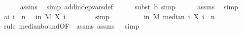 \begin{isabellebody}
\ \ \ \ \isamarkupfalse%
\ assms{\isacharparenleft}{\kern0pt}{}{\isacharparenright}{\kern0pt}\ \isamarkupfalse%
\ {\isacharparenleft}{\kern0pt}simp\ add{\isacharcolon}{\kern0pt}indep{\isacharunderscore}{\kern0pt}vars{\isacharunderscore}{\kern0pt}def{\isacharparenright}{\kern0pt}\isanewline
\ \ \ \ \isamarkupfalse%
\ {\isacharparenleft}{\kern0pt}subst\ b{\isacharcomma}{\kern0pt}\ simp{\isacharparenright}{\kern0pt}\isanewline
\ \ \ \ \isamarkupfalse%
\ assms{\isacharparenleft}{\kern0pt}{}{\isacharparenright}{\kern0pt}\ \isamarkupfalse%
\ simp\isanewline
\isanewline
\ \ \isamarkupfalse%
\ a{\isacharcolon}{\kern0pt}{\isachardoublequoteopen}{\isasymAnd}i{\isachardot}{\kern0pt}\ i\ {\isacharless}{\kern0pt}\ n\ {\isasymLongrightarrow}\ {\isasymP}{\isacharparenleft}{\kern0pt}{\isasymomega}\ in\ M{\isachardot}{\kern0pt}\ X\ i\ {\isasymomega}\ {\isasymin}\ {\isacharbraceleft}{\kern0pt}{\isasymmu}{\isacharminus}{\kern0pt}\ {\isasymdelta}{\isachardot}{\kern0pt}{\isachardot}{\kern0pt}{\isasymmu}{\isacharplus}{\kern0pt}{\isasymdelta}{\isacharbraceright}{\kern0pt}{\isacharparenright}{\kern0pt}\ {\isasymge}\ {}{\isacharslash}{\kern0pt}{}{\isachardoublequoteclose}\ \isamarkupfalse%
\ simp\isanewline
\ \ \isanewline
\ \ \isamarkupfalse%
\ {\isachardoublequoteopen}{}{\isacharminus}{\kern0pt}{\isasymepsilon}\ {\isasymle}\ {\isasymP}{\isacharparenleft}{\kern0pt}{\isasymomega}\ in\ M{\isachardot}{\kern0pt}\ median\ {\isacharparenleft}{\kern0pt}{\isasymlambda}i{\isachardot}{\kern0pt}\ X\ i\ {\isasymomega}{\isacharparenright}{\kern0pt}\ n\ {\isasymin}\ {\isacharbraceleft}{\kern0pt}{\isasymmu}{\isacharminus}{\kern0pt}{\isasymdelta}{\isachardot}{\kern0pt}{\isachardot}{\kern0pt}{\isasymmu}{\isacharplus}{\kern0pt}{\isasymdelta}{\isacharbraceright}{\kern0pt}{\isacharparenright}{\kern0pt}{\isachardoublequoteclose}\isanewline
\ \ \ \ \isamarkupfalse%
\ {\isacharparenleft}{\kern0pt}rule\ median{\isacharunderscore}{\kern0pt}bound{\isacharunderscore}{\kern0pt}{}{\isacharbrackleft}{\kern0pt}OF\ {\isacharunderscore}{\kern0pt}\ assms{\isacharparenleft}{\kern0pt}{}{\isacharparenright}{\kern0pt}\ assms{\isacharparenleft}{\kern0pt}{}{\isacharparenright}{\kern0pt}{\isacharcomma}{\kern0pt}\ \ {\isasymalpha}{\isacharequal}{\kern0pt}{\isachardoublequoteopen}{}{\isacharslash}{\kern0pt}{}{\isachardoublequoteclose}{\isacharbrackright}{\kern0pt}{\isacharcomma}{\kern0pt}\ simp{\isacharparenright}{\kern0pt}\ \isanewline

\end{isabellebody}
